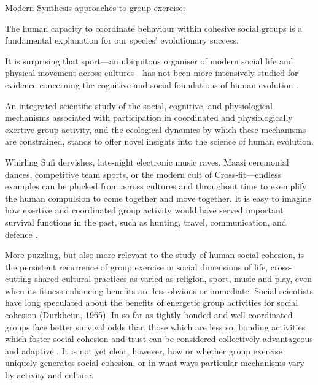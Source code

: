 Modern Synthesis approaches to group exercise:








The human capacity to coordinate behaviour within cohesive social groups is a fundamental explanation for our species' evolutionary success.

It is surprising that sport---an ubiquitous organiser of modern social life and physical movement across cultures---has not been more intensively studied for evidence concerning the cognitive and social foundations of human evolution \citep{Blanchard1995,Downey2005a}.

An integrated scientific study of the social, cognitive, and physiological mechanisms associated with participation in coordinated and physiologically exertive group activity, and the ecological dynamics by which these mechanisms are constrained, stands to offer novel insights into the science of human evolution.



Whirling Sufi dervishes, late-night electronic music raves, Maasi ceremonial dances, competitive team sports, or the modern cult of Cross-fit---endless examples can be plucked from across cultures and throughout time to exemplify the human compulsion to come together and move together.  It is easy to imagine how exertive and coordinated group activity would have served important survival functions in the past, such as hunting, travel, communication, and defence \citep{Sands2010}.

More puzzling, but also more relevant to the study of human social cohesion, is the persistent recurrence of group exercise in social dimensions of life, cross-cutting shared cultural practices as varied as religion, sport, music and play, even when its fitness-enhancing benefits are less obvious or immediate.  Social scientists have long speculated about the benefits of energetic group activities for social cohesion (Durkheim, 1965). In so far as tightly bonded and well coordinated groups face better survival odds than those which are less so, bonding activities which foster social cohesion and trust can be considered collectively advantageous and adaptive \citep{Dunbar2010}.  It is not yet clear, however, how or whether group exercise uniquely generates social cohesion, or in what ways particular mechanisms vary by activity and culture.

